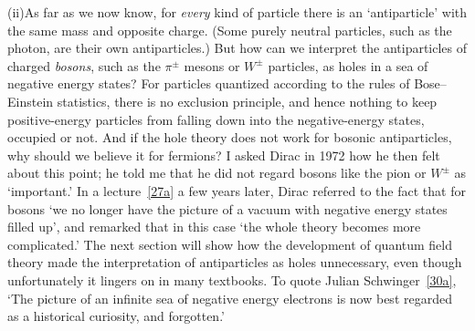 \medskip
\noindent
(ii)\quad As far as we now know, for \emph{every} kind of particle there is an
`antiparticle' with the same mass and opposite charge. (Some purely
neutral particles, such as the photon, are their own antiparticles.) But
how can we interpret the antiparticles of charged \emph{bosons}, such as the
$\pi^\pm$ mesons or $W^\pm$ particles, as holes in a sea of negative energy states?
For particles quantized according to the rules of Bose--Einstein statistics,
there is no exclusion principle, and hence nothing to keep positive-energy
particles from falling down into the negative-energy states, occupied or
not. And if the hole theory does not work for bosonic antiparticles, why
should we believe it for fermions? I asked Dirac in 1972 how he then felt
about this point; he told me that he did not regard bosons like the pion
or $W^\pm$ as `important.' In a lecture~\hyperref[ref:1.27a]{[27a]} a few years later, Dirac referred
to the fact that for bosons `we no longer have the picture of a vacuum
with negative energy states filled up', and remarked that in this case `the
whole theory becomes more complicated.' The next section will show
how the development of quantum field theory made the interpretation of
antiparticles as holes unnecessary, even though unfortunately it lingers
on in many textbooks. To quote Julian Schwinger~\hyperref[ref:1.30a]{[30a]}, `The picture of an
infinite sea of negative energy electrons is now best regarded as a historical
curiosity, and forgotten.'

